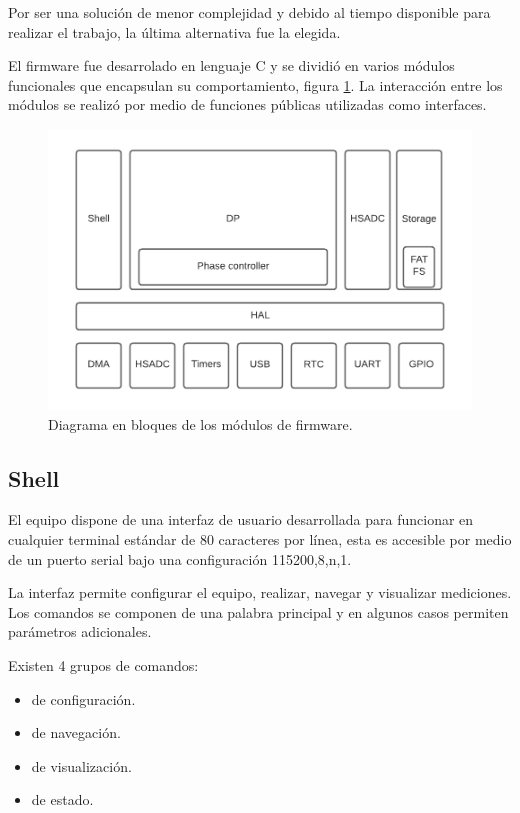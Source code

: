 \vspace{5mm}

Por ser una solución de menor complejidad y debido al tiempo disponible para realizar el trabajo, la última alternativa fue la elegida.

El firmware fue desarrolado en lenguaje C y se dividió en varios módulos funcionales que encapsulan su comportamiento, figura \ref{fig:firmBloques}. La interacción entre los módulos se realizó por medio de funciones públicas utilizadas como interfaces. 
\vspace{10mm}

\begin{figure}[ht]
	\centering
	\includegraphics[width=140mm]{./Figures/firmBloques.png}
	\caption{Diagrama en bloques de los módulos de firmware.}
	\label{fig:firmBloques}
\end{figure}


\subsection{Shell}
El equipo dispone de una interfaz de usuario desarrollada para funcionar en cualquier terminal estándar de 80 caracteres por línea, esta es accesible por medio de un puerto serial bajo una configuración 115200,8,n,1.

La interfaz permite configurar el equipo, realizar, navegar y visualizar mediciones. Los comandos se componen de una palabra principal y en algunos casos permiten parámetros adicionales. 

\vspace{5mm}

Existen 4 grupos de comandos:
\begin{itemize}
\item  de configuración.
\item  de navegación.
\item  de visualización.
\item de estado. 

\end{itemize}

